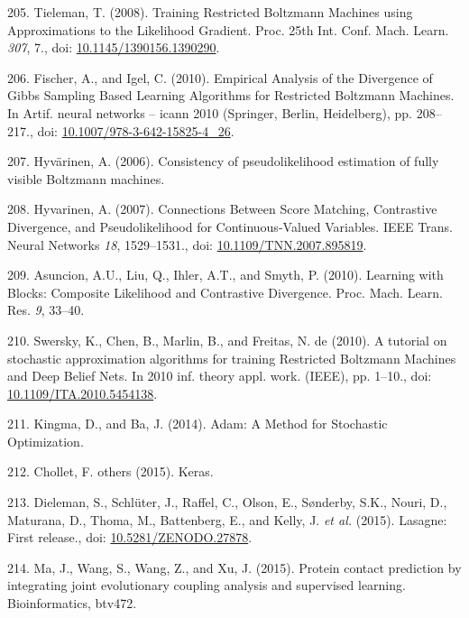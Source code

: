 \documentclass[11pt,a4paper,twoside]{book}
\theoremstyle{definition}
\theoremstyle{definition}
\theoremstyle{remark}
\begin{document}
\hypertarget{ref-Tieleman2008}{}
205. Tieleman, T. (2008). Training Restricted Boltzmann Machines using
Approximations to the Likelihood Gradient. Proc. 25th Int. Conf. Mach.
Learn. \emph{307}, 7., doi:
\href{https://doi.org/10.1145/1390156.1390290}{10.1145/1390156.1390290}.

\hypertarget{ref-Fischer2010}{}
206. Fischer, A., and Igel, C. (2010). Empirical Analysis of the
Divergence of Gibbs Sampling Based Learning Algorithms for Restricted
Boltzmann Machines. In Artif. neural networks -- icann 2010 (Springer,
Berlin, Heidelberg), pp. 208--217., doi:
\href{https://doi.org/10.1007/978-3-642-15825-4_26}{10.1007/978-3-642-15825-4\_26}.

\hypertarget{ref-Hyvarinen2006}{}
207. Hyvärinen, A. (2006). Consistency of pseudolikelihood estimation of
fully visible Boltzmann machines.

\hypertarget{ref-Hyvarinen2007}{}
208. Hyvarinen, A. (2007). Connections Between Score Matching,
Contrastive Divergence, and Pseudolikelihood for Continuous-Valued
Variables. IEEE Trans. Neural Networks \emph{18}, 1529--1531., doi:
\href{https://doi.org/10.1109/TNN.2007.895819}{10.1109/TNN.2007.895819}.

\hypertarget{ref-Asuncion2010}{}
209. Asuncion, A.U., Liu, Q., Ihler, A.T., and Smyth, P. (2010).
Learning with Blocks: Composite Likelihood and Contrastive Divergence.
Proc. Mach. Learn. Res. \emph{9}, 33--40.

\hypertarget{ref-Swersky2010}{}
210. Swersky, K., Chen, B., Marlin, B., and Freitas, N. de (2010). A
tutorial on stochastic approximation algorithms for training Restricted
Boltzmann Machines and Deep Belief Nets. In 2010 inf. theory appl. work.
(IEEE), pp. 1--10., doi:
\href{https://doi.org/10.1109/ITA.2010.5454138}{10.1109/ITA.2010.5454138}.

\hypertarget{ref-Kingma2014}{}
211. Kingma, D., and Ba, J. (2014). Adam: A Method for Stochastic
Optimization.

\hypertarget{ref-Chollet2015}{}
212. Chollet, F. others (2015). Keras.

\hypertarget{ref-Dieleman2015}{}
213. Dieleman, S., Schlüter, J., Raffel, C., Olson, E., Sønderby, S.K.,
Nouri, D., Maturana, D., Thoma, M., Battenberg, E., and Kelly, J.
\emph{et al.} (2015). Lasagne: First release., doi:
\href{https://doi.org/10.5281/ZENODO.27878}{10.5281/ZENODO.27878}.

\hypertarget{ref-Ma2015a}{}
214. Ma, J., Wang, S., Wang, Z., and Xu, J. (2015). Protein contact
prediction by integrating joint evolutionary coupling analysis and
supervised learning. Bioinformatics, btv472.
\end{document}
